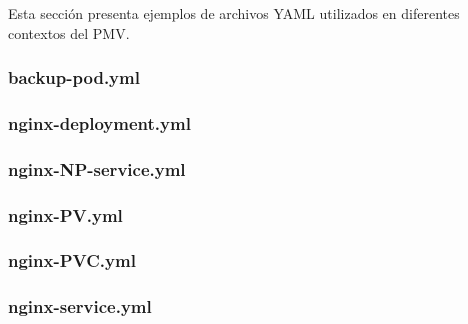 Esta sección presenta ejemplos de archivos YAML utilizados en diferentes contextos del PMV.
\subsubsection{backup-pod.yml}
\noindent


\subsubsection{nginx-deployment.yml}
\noindent


\subsubsection{nginx-NP-service.yml}
\noindent


\subsubsection{nginx-PV.yml}
\noindent


\subsubsection{nginx-PVC.yml}
\noindent


\subsubsection{nginx-service.yml}
\noindent
